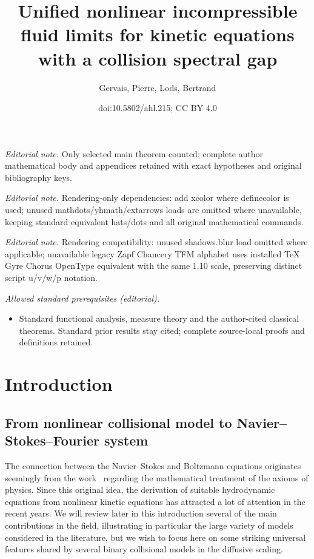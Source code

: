 \documentclass[10pt]{amsart}
\title{Unified nonlinear incompressible fluid limits for kinetic equations with a collision spectral gap}
\author{Gervais, Pierre, Lods, Bertrand}
\date{doi:10.5802/ahl.215; CC BY 4.0}
\theoremstyle{definition}\newtheorem{defi}[theo]{Definition}\newtheorem{rema}[theo]{Remark}\newtheorem{exam}[theo]{Example}\newtheorem{exem}[theo]{Example}\newtheorem{nota}[theo]{Notation}
\begin{document}
\maketitle
\noindent\textit{Editorial note.} Only selected main theorem counted; complete author mathematical body and appendices retained with exact hypotheses and original bibliography keys.\par\medskip
\noindent\textit{Editorial note.} Rendering-only dependencies: add xcolor where definecolor is used; unused mathdots/yhmath/extarrows loads are omitted where unavailable, keeping standard equivalent hats/dots and all original mathematical commands.\par\medskip
\noindent\textit{Editorial note.} Rendering compatibility: unused shadows.blur load omitted where applicable; unavailable legacy Zapf Chancery TFM alphabet uses installed TeX Gyre Chorus OpenType equivalent with the same 1.10 scale, preserving distinct script u/v/w/p notation.\par\medskip
\noindent\textit{Allowed standard prerequisites (editorial).}\begin{itemize}
\item Standard functional analysis, measure theory and the author-cited classical theorems. Standard prior results stay cited; complete source-local proofs and definitions retained.
\end{itemize}\medskip
\break
\section{Introduction}



\subsection{From nonlinear collisional model to Navier--Stokes--Fourier system}

The connection between the Navier--Stokes and Boltzmann equations originates seemingly from the work~\cite{H1912} regarding the mathematical treatment of the axioms of physics. Since this original idea, the derivation of suitable hydrodynamic equations from nonlinear kinetic equations has attracted a lot of attention in the recent years. We will review later in this introduction several of the main contributions in the field, illustrating in particular the large variety of models considered in the literature, but we wish to focus here on some striking universal features shared by several binary collisional models in the diffusive scaling.
\end{document}
